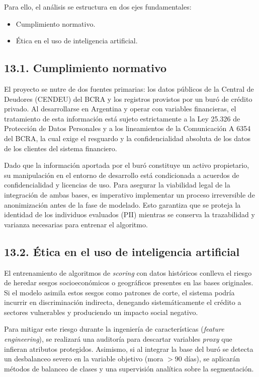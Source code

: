 \documentclass[
11pt, %
]{charter}
\begin{document}
Para ello, el análisis se estructura en dos ejes fundamentales:
\begin{itemize}
    \item Cumplimiento normativo.
    \item Ética en el uso de inteligencia artificial.
\end{itemize}

\subsection*{13.1. Cumplimiento normativo}

El proyecto se nutre de dos fuentes primarias: los datos públicos de la Central de Deudores (CENDEU) del BCRA y los registros provistos por un buró de crédito privado. Al desarrollarse en Argentina y operar con variables financieras, el tratamiento de esta información está sujeto estrictamente a la Ley 25.326 de Protección de Datos Personales y a los lineamientos de la Comunicación A 6354 del BCRA, la cual exige el resguardo y la confidencialidad absoluta de los datos de los clientes del sistema financiero.

Dado que la información aportada por el buró constituye un activo propietario, su manipulación en el entorno de desarrollo está condicionada a acuerdos de confidencialidad y licencias de uso. Para asegurar la viabilidad legal de la integración de ambas bases, es imperativo implementar un proceso irreversible de anonimización antes de la fase de modelado. Esto garantiza que se proteja la identidad de los individuos evaluados (PII) mientras se conserva la trazabilidad y varianza necesarias para entrenar el algoritmo.

\subsection*{13.2. Ética en el uso de inteligencia artificial}

El entrenamiento de algoritmos de \textit{scoring} con datos históricos conlleva el riesgo de heredar sesgos socioeconómicos o geográficos presentes en las bases originales. Si el modelo asimila estos sesgos como patrones de corte, el sistema podría incurrir en discriminación indirecta, denegando sistemáticamente el crédito a sectores vulnerables y produciendo un impacto social negativo.

Para mitigar este riesgo durante la ingeniería de características (\textit{feature engineering}), se realizará una auditoría para descartar variables \textit{proxy} que infieran atributos protegidos. Asimismo, si al integrar la base del buró se detecta un desbalanceo severo en la variable objetivo (mora $>90$ días), se aplicarán métodos de balanceo de clases y una supervisión analítica sobre la segmentación.
\end{document}

